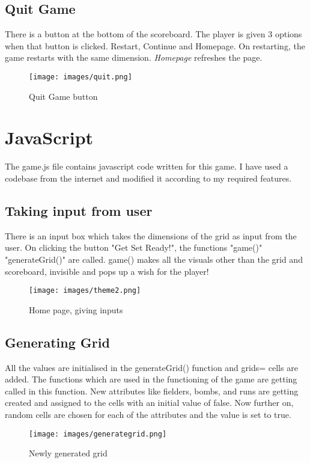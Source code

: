 \documentclass{article}
\begin{document}
\subsection{Quit Game}
There is a button at the bottom of the scoreboard. The player is given 3 options when that button is clicked. Restart, Continue and Homepage. On restarting, the game restarts with the same dimension. \textit{Homepage} refreshes the page. 
\begin{figure}[h]
    \centering
    \texttt{[image: images/quit.png]}
    \caption{Quit Game button}
    \label{fig:enter-label}
\end{figure}
\section{JavaScript}
The game.js file contains javascript code written for this game. I have used a codebase \cite{jscodebase:latex} from the internet and modified it according to my required features. 
\subsection{Taking input from user}
There is an input box which takes the dimensions of the grid as input from the user. On clicking the button "Get Set Ready!", the functions "game()" "generateGrid()" are called. game() makes all the visuals other than the grid and scoreboard, invisible and pops up a wish for the player! 
\begin{figure}[h]
    \centering
    \texttt{[image: images/theme2.png]}
    \caption{Home page, giving inputs}
    \label{fig:enter-label}
\end{figure}
\subsection{Generating Grid}
All the values are initialised in the generateGrid() function and grids= cells are added. The functions which are used in the functioning of the game are getting called in this function. New attributes like fielders, bombs, and runs are getting created and assigned to the cells with an initial value of false. Now further on, random cells are chosen for each of the attributes and the value is set to true.
\begin{figure}[h]
    \centering
    \texttt{[image: images/generategrid.png]}
    \caption{Newly generated grid}
    \label{fig:enter-label}
\end{figure}
\end{document}
